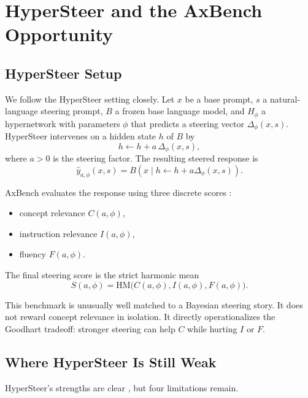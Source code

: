 \documentclass[10pt]{article}
\newcommand{\HM}{\mathrm{HM}}
\begin{document}
\section{HyperSteer and the AxBench Opportunity}

\subsection{HyperSteer Setup}

We follow the HyperSteer setting closely. Let $x$ be a base prompt, $s$ a natural-language steering prompt, $B$ a frozen base language model, and $H_\phi$ a hypernetwork with parameters $\phi$ that predicts a steering vector $\Delta_\phi(x,s)$. HyperSteer intervenes on a hidden state $h$ of $B$ by
\begin{equation}
h \leftarrow h + a \, \Delta_\phi(x,s),
\end{equation}
where $a > 0$ is the steering factor. The resulting steered response is
\begin{equation}
\hat{y}_{a,\phi}(x,s) = B\!\left(x \mid h \leftarrow h + a \Delta_\phi(x,s)\right).
\end{equation}

AxBench evaluates the response using three discrete scores \citep{wu2025axbench}:
\begin{itemize}[leftmargin=1.5em]
  \item concept relevance $C(a,\phi)$,
  \item instruction relevance $I(a,\phi)$,
  \item fluency $F(a,\phi)$.
\end{itemize}
The final steering score is the strict harmonic mean
\begin{equation}
S(a,\phi) = \HM\!\big(C(a,\phi), I(a,\phi), F(a,\phi)\big).
\end{equation}

This benchmark is unusually well matched to a Bayesian steering story. It does not reward concept relevance in isolation. It directly operationalizes the Goodhart tradeoff: stronger steering can help $C$ while hurting $I$ or $F$.

\subsection{Where HyperSteer Is Still Weak}

HyperSteer’s strengths are clear \citep{sun2025hypersteer}, but four limitations remain.
\end{document}
